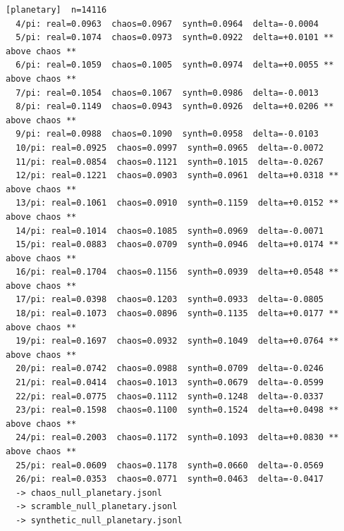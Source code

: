 \documentclass[11pt, letterpaper, openany]{book}
\begin{document}
\begin{empiricalbox}
\begin{lstlisting}[style=terminal]
[planetary]  n=14116
  4/pi: real=0.0963  chaos=0.0967  synth=0.0964  delta=-0.0004
  5/pi: real=0.1074  chaos=0.0973  synth=0.0922  delta=+0.0101 ** above chaos **
  6/pi: real=0.1059  chaos=0.1005  synth=0.0974  delta=+0.0055 ** above chaos **
  7/pi: real=0.1054  chaos=0.1067  synth=0.0986  delta=-0.0013
  8/pi: real=0.1149  chaos=0.0943  synth=0.0926  delta=+0.0206 ** above chaos **
  9/pi: real=0.0988  chaos=0.1090  synth=0.0958  delta=-0.0103
  10/pi: real=0.0925  chaos=0.0997  synth=0.0965  delta=-0.0072
  11/pi: real=0.0854  chaos=0.1121  synth=0.1015  delta=-0.0267
  12/pi: real=0.1221  chaos=0.0903  synth=0.0961  delta=+0.0318 ** above chaos **
  13/pi: real=0.1061  chaos=0.0910  synth=0.1159  delta=+0.0152 ** above chaos **
  14/pi: real=0.1014  chaos=0.1085  synth=0.0969  delta=-0.0071
  15/pi: real=0.0883  chaos=0.0709  synth=0.0946  delta=+0.0174 ** above chaos **
  16/pi: real=0.1704  chaos=0.1156  synth=0.0939  delta=+0.0548 ** above chaos **
  17/pi: real=0.0398  chaos=0.1203  synth=0.0933  delta=-0.0805
  18/pi: real=0.1073  chaos=0.0896  synth=0.1135  delta=+0.0177 ** above chaos **
  19/pi: real=0.1697  chaos=0.0932  synth=0.1049  delta=+0.0764 ** above chaos **
  20/pi: real=0.0742  chaos=0.0988  synth=0.0709  delta=-0.0246
  21/pi: real=0.0414  chaos=0.1013  synth=0.0679  delta=-0.0599
  22/pi: real=0.0775  chaos=0.1112  synth=0.1248  delta=-0.0337
  23/pi: real=0.1598  chaos=0.1100  synth=0.1524  delta=+0.0498 ** above chaos **
  24/pi: real=0.2003  chaos=0.1172  synth=0.1093  delta=+0.0830 ** above chaos **
  25/pi: real=0.0609  chaos=0.1178  synth=0.0660  delta=-0.0569
  26/pi: real=0.0353  chaos=0.0771  synth=0.0463  delta=-0.0417
  -> chaos_null_planetary.jsonl
  -> scramble_null_planetary.jsonl
  -> synthetic_null_planetary.jsonl


\end{lstlisting}
\end{empiricalbox}
\end{document}
